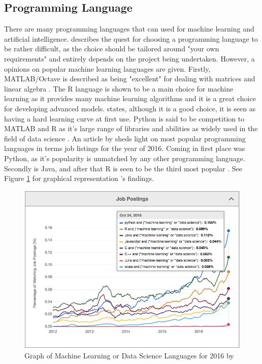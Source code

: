 \subsection{Programming Language}
There are many programming languages that can used for machine learning and artificial intelligence. \citeauthor{brownlee} describes the quest for choosing a programming language to be rather difficult, as the choice should be tailored around "your own requirements" and entirely depends on the project being undertaken. However, a opinions on popular machine learning languages are given. Firstly, MATLAB/Octave is described as being "excellent" for dealing with matrices and linear algebra \citep{brownlee}. The R language is shown to be a main choice for machine learning as it provides many machine learning algorithms and it is a great choice for developing advanced models. \citeauthor{brownlee} states, although it is a good choice, it is seen as having a hard learning curve at first use. Python is said to be competition to MATLAB and R as it's large range of libraries and abilities as widely used in the field of data science \citep{brownlee}.
An article by \citeauthor{verma_2017} sheds light on most popular programming languages in terms job listings for the year of 2016. Coming in first place was Python, as it's popularity is unmatched by any other programming language. Secondly is Java, and after that R is seen to be the third most popular \citep{verma_2017}. See Figure \ref{verma} for graphical representation \citeauthor{verma_2017}'s findings.

\begin{figure}[ht]
	\begin{center}
		\advance\leftskip-3cm
		\advance\rightskip-3cm
		\includegraphics[keepaspectratio=true,scale=0.6]{__resources/top_lang.jpg}
		\caption{Graph of Machine Learning or Data Science Languages for 2016 by \cite{verma_2017}}
		\label{verma}
	\end{center}
\end{figure}

